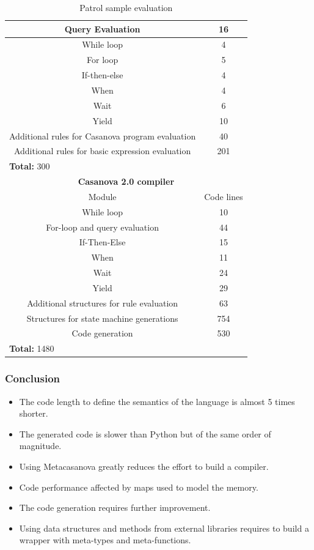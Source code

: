 \documentclass[10pt,a4paper]{beamer}
\begin{document}
\begin{frame}
\begin{table}
\begin{tabular}{|c|c|}
			\hline
			Query Evaluation & 16 \\
			\hline
			While loop & 4 \\
			\hline
			For loop & 5 \\
			\hline
			If-then-else & 4 \\
			\hline
			When & 4 \\
			\hline
			Wait & 6 \\
			\hline
			Yield & 10 \\
			\hline
			Additional rules for Casanova program evaluation & 40 \\
			\hline
			Additional rules for basic expression evaluation & 201 \\
			\hline
			\multicolumn{2}{|l|}{\textbf{Total: } 300} \\
			\hline
			\multicolumn{2}{|c|}{\textbf{Casanova 2.0 compiler}} \\
			\hline
			Module & Code lines \\
			\hline
			While loop & 10 \\
			\hline
			For-loop and query evaluation & 44 \\
			\hline
			If-Then-Else & 15 \\
			\hline
			When & 11 \\
			\hline
			Wait & 24 \\
			\hline
			Yield & 29 \\
			\hline
			Additional structures for rule evaluation & 63 \\
			\hline
			Structures for state machine generations & 754 \\
			\hline
			Code generation & 530 \\
			\hline
			\multicolumn{2}{|l|}{\textbf{Total: } 1480} \\
			\hline			
		\end{tabular}
		\caption{Patrol sample evaluation}
		\label{tab:evaluation}
	\end{table}	
\end{frame}

\begin{frame}
	\frametitle{Conclusion}
	\begin{itemize}
		\item The code length to define the semantics of the language is almost 5 times shorter.
		\item The generated code is slower than Python but of the same order of magnitude.
		\item Using Metacasanova greatly reduces the effort to build a compiler.
		\item Code performance affected by maps used to model the memory.
		\item The code generation requires further improvement.
		\item Using data structures and methods from external libraries requires to build a wrapper with meta-types and meta-functions.
	\end{itemize}
\end{frame}
\end{document}

